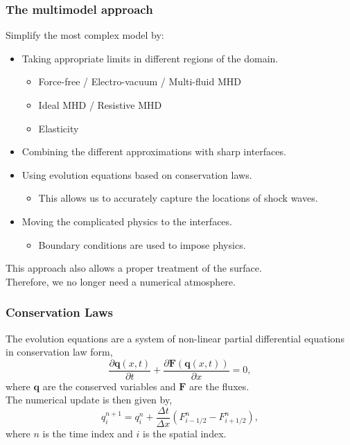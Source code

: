 \documentclass{beamer}
\begin{document}
\begin{frame}
\frametitle{The multimodel approach}
Simplify the most complex model by:
\begin{itemize}
\item{Taking appropriate limits in different regions of the domain.}
\begin{itemize}
\item{Force-free / Electro-vacuum / Multi-fluid MHD}
\item{Ideal MHD / Resistive MHD}
\item{Elasticity}
\end{itemize}
\item{Combining the different approximations with sharp interfaces.}
\item{Using evolution equations based on conservation laws.}
\begin{itemize}
\item{This allows us to accurately capture the locations of shock waves.}
\end{itemize}
\item{Moving the complicated physics to the interfaces.}
\begin{itemize}
\item{Boundary conditions are used to impose physics.}
\end{itemize}
\end{itemize}
This approach also allows a proper treatment of the surface. \\
Therefore, we no longer need a numerical atmosphere. 
\end{frame}

\begin{frame}
\frametitle{Conservation Laws}
The evolution equations are a system of non-linear partial differential equations in conservation law form,
\begin{equation}
\frac{\partial \mathbf{q}(x,t)}{\partial t}  + \frac{\partial \mathbf{F}(\mathbf{q}(x,t))}{\partial x} = 0,
\end{equation}
where $\mathbf{q}$ are the conserved variables and $\mathbf{F}$ are the fluxes.\\
The numerical update is then given by,
\begin{equation}
q^{n+1}_i = q^n_i + \frac{\Delta t}{\Delta x} \left(F^n_{i-1/2} - F^n_{i+1/2}\right),
\end{equation}
where $n$ is the time index and $i$ is the spatial index.
\end{frame}
\end{document}
